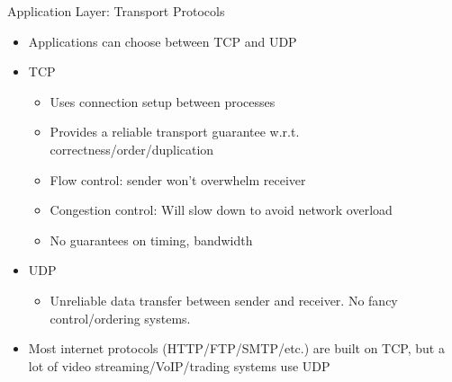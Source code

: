 \documentclass{beamer}
\begin{document}
\begin{frame}[t]{Application Layer: Transport Protocols}
\begin{itemize}
    \item Applications can choose between TCP and UDP
    \item \pause TCP
    \begin{itemize}
        \item Uses connection setup between processes
        \item Provides a \alert{reliable transport} guarantee w.r.t. correctness/order/duplication
        \item \alert{Flow control}: sender won't overwhelm receiver
        \item \alert{Congestion control}: Will slow down to avoid network overload
        \item No guarantees on timing, bandwidth
    \end{itemize}
    \item \pause UDP
    \begin{itemize}
        \item Unreliable data transfer between sender and receiver. No fancy control/ordering systems.
    \end{itemize}
    \item \pause Most internet protocols (HTTP/FTP/SMTP/etc.) are built on TCP, but a lot of video streaming/VoIP/trading systems use UDP
\end{itemize}
\end{frame}
\end{document}
